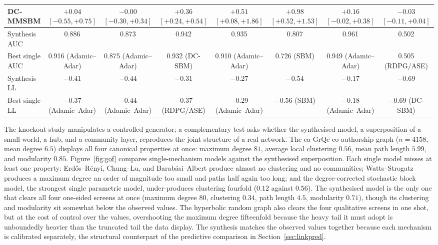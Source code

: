 \documentclass[12pt]{article}
\makeatletter
\def\subsection{\@startsection{subsection}{2}{\z@}{-0.13in}{0.03in}{\normalsize\bf\raggedright}}
\newcommand{\1}{\mathbf{1}}
\makeatother
\begin{document}
\begin{table}[t]
{\begin{tabular}{lccccccc}
DC-MMSBM & $+0.04$ {\tiny$[-0.55,+0.75]$} & $-0.00$ {\tiny$[-0.30,+0.34]$} & $\mathbf{+0.36}$ {\tiny$[+0.24,+0.54]$} & $+0.51$ {\tiny$[+0.08,+1.86]$} & $+0.98$ {\tiny$[+0.52,+1.53]$} & $+0.16$ {\tiny$[-0.02,+0.38]$} & $-0.03$ {\tiny$[-0.11,+0.04]$}\\
\midrule
Synthesis AUC & 0.886 & 0.873 & 0.942 & 0.935 & 0.807 & 0.961 & 0.502\\
Best single AUC & 0.916 {\tiny(Adamic--Adar)} & 0.875 {\tiny(Adamic--Adar)} & 0.932 {\tiny(DC-SBM)} & 0.910 {\tiny(Adamic--Adar)} & 0.726 {\tiny(SBM)} & 0.949 {\tiny(Adamic--Adar)} & 0.505 {\tiny(RDPG/ASE)}\\
Synthesis LL & $-0.41$ & $-0.44$ & $-0.31$ & $-0.27$ & $-0.54$ & $-0.17$ & $-0.69$\\
Best single LL & $-0.37$ {\tiny(Adamic--Adar)} & $-0.44$ {\tiny(Adamic--Adar)} & $-0.37$ {\tiny(RDPG/ASE)} & $-0.29$ {\tiny(Adamic--Adar)} & $-0.56$ {\tiny(SBM)} & $-0.18$ {\tiny(Adamic--Adar)} & $-0.69$ {\tiny(DC-SBM)}\\
\bottomrule
\end{tabular}}
\end{table}








\subsection{Structural goodness-of-fit on \textsf{ca-GrQc}}
\label{sec:gof}
The knockout study manipulates a controlled generator; a complementary test asks whether the synthesised model, a superposition of a small-world, a hub, and a community layer, reproduces the joint structure of a real network. The \textsf{ca-GrQc} co-authorship graph \citep{leskovec2007graph} ($n=4158$, mean degree $6.5$) displays all four canonical properties at once: maximum degree $81$, average local clustering $0.56$, mean path length $5.99$, and modularity $0.85$. Figure~\ref{fig:gof} compares single-mechanism models against the synthesised superposition. Each single model misses at least one property: Erd\H{o}s--R\'enyi, Chung--Lu, and Barab\'asi--Albert produce almost no clustering and no communities; Watts--Strogatz produces a maximum degree an order of magnitude too small and paths half again too long; and the degree-corrected stochastic block model, the strongest single parametric model, under-produces clustering fourfold ($0.12$ against $0.56$). The synthesised model is the only one that clears all four one-sided screens at once (maximum degree $80$, clustering $0.34$, path length $4.5$, modularity $0.71$), though its clustering and modularity sit somewhat below the observed values. The hyperbolic random graph also clears the four qualitative screens in one shot, but at the cost of control over the values, overshooting the maximum degree fifteenfold because the heavy tail it must adopt is unboundedly heavier than the truncated tail the data display. The synthesis matches the observed values together because each mechanism is calibrated separately, the structural counterpart of the predictive comparison in Section~\ref{sec:linkpred}.
\end{document}
